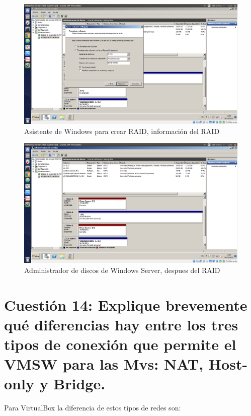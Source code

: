 \begin{figure}[H] %
\centering
\includegraphics[scale=0.3]{img/P1-Ejercicio13-7.png} 
\caption{Asistente de Windows para crear RAID, información del RAID} \label{fig:P1_E13_7}
\end{figure}


\begin{figure}[H] %
\centering
\includegraphics[scale=0.3]{img/P1-Ejercicio13-9.png} 
\caption{Administrador de discos de Windows Server, despues del RAID} \label{fig:P1_E13_9}
\end{figure}





\section{Cuestión 14: Explique brevemente qué diferencias hay entre los tres tipos
de conexión que permite el VMSW para las Mvs: NAT, Host-only y Bridge.}
Para VirtualBox \cite{VirtualBoxRedes} la diferencia de estos tipos de redes son:

